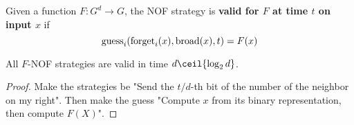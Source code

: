\begin{definition}
  \label{def:valid-strategy}

  Given a function $F : G^d \to G$, the NOF strategy is {\bf valid for $F$ at time $t$ on input $x$} if
  $$\operatorname{guess}_i(\operatorname{forget}_i(x), \operatorname{broad}(x), t) = F(x)$$
\end{definition}

\begin{lemma}
  \label{lem:eventually-valid-strategy}

  All $F$-NOF strategies are valid in time $d\ceil{\log_2 d}$.
\end{lemma}
\begin{proof}

  Make the strategies be "Send the $t / d$-th bit of the number of the neighbor on my right". Then make the guess "Compute $x$ from its binary representation, then compute $F(X)$".
\end{proof}
